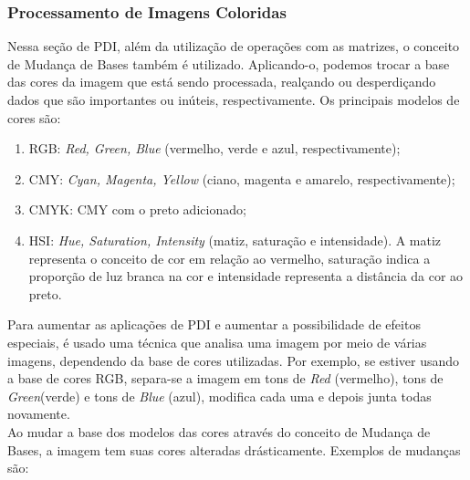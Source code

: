 \documentclass{article}
\begin{document}
            \subsubsection{Processamento de Imagens Coloridas}
            Nessa seção de PDI, além da utilização de operações com as matrizes, o conceito de Mudança de Bases também é utilizado. Aplicando-o, podemos trocar a base das cores da imagem que está sendo processada, realçando ou desperdiçando dados que são importantes ou inúteis, respectivamente. Os principais modelos de cores são:
            
            \begin{enumerate}
            
            \item RGB: {\it Red, Green, Blue} (vermelho, verde e azul, respectivamente);
            
            \item CMY: {\it Cyan, Magenta, Yellow} (ciano, magenta e amarelo, respectivamente);
            
            \item CMYK: CMY com o preto adicionado;
            
            \item HSI: {\it Hue, Saturation, Intensity} (matiz, saturação e intensidade). A matiz representa o conceito de cor em relação ao vermelho, saturação indica a proporção de luz branca na cor e intensidade representa a distância da cor ao preto.
            
            \end{enumerate}
            Para aumentar as aplicações de PDI e aumentar a possibilidade de efeitos especiais, é usado uma técnica que analisa uma imagem por meio de várias imagens, dependendo da base de cores utilizadas. Por exemplo, se estiver usando a base de cores RGB, separa-se a imagem em tons de {\it Red} (vermelho), tons de {\it Green}(verde) e tons de {\it Blue} (azul), modifica cada uma e depois junta todas novamente.\\
            Ao mudar a base dos modelos das cores através do conceito de Mudança de Bases, a imagem tem suas cores alteradas drásticamente. Exemplos de mudanças são:
            
\end{document}
